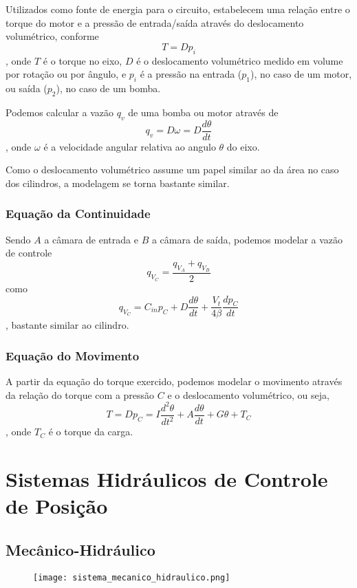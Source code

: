 \documentclass[a4paper]{report}
\begin{document}
Utilizados como fonte de energia para o circuito, estabelecem uma relação entre o torque do motor e a pressão de entrada/saída através do deslocamento volumétrico, conforme \[
T = Dp_i
\], onde $T$ é o torque no eixo, $D$ é o deslocamento volumétrico medido em volume por rotação ou por ângulo, e $p_i$ é a pressão na entrada ($p_1$), no caso de um motor, ou saída ($p_2$), no caso de um bomba.

Podemos calcular a vazão $q_v$ de uma bomba ou motor através de \[
q_v = D\omega = D \frac{d\theta}{dt}
\], onde $\omega$ é a velocidade angular relativa ao angulo $\theta$ do eixo.

Como o deslocamento volumétrico assume um papel similar ao da área no caso dos cilindros, a modelagem se torna bastante similar.

\subsubsection*{Equação da Continuidade}

Sendo $A$ a câmara de entrada e $B$ a câmara de saída, podemos modelar a vazão de controle \[
q_{V_C} = \frac{q_{V_A}+q_{V_B}}{2}
\] como \[
q_{V_C} = C_{in}p_{C} + D \frac{d\theta}{dt} + \frac{V_t}{4\beta} \frac{d p_C}{dt}
\], bastante similar ao cilindro.

\subsubsection*{Equação do Movimento}

A partir da equação do torque exercido, podemos modelar o movimento através da relação do torque com a pressão $C$ e o deslocamento volumétrico, ou seja, \[
T = D p_C = I \frac{d^2\theta}{dt^2} + A \frac{d\theta}{dt} +G\theta + T_C
\], onde $T_C$ é o torque da carga.

\section*{Sistemas Hidráulicos de Controle de Posição}

\subsection*{Mecânico-Hidráulico}

\begin{figure}[H]
    \centering
    \texttt{[image: sistema\_mecanico\_hidraulico.png]}
\end{figure}
\end{document}
